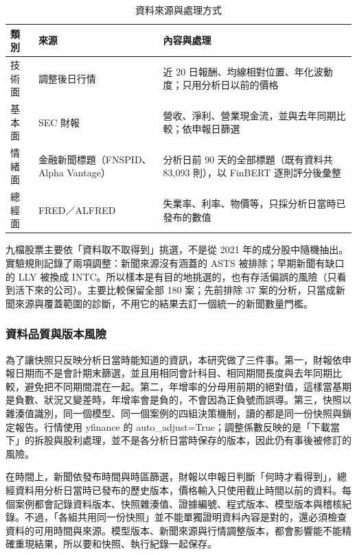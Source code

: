 \documentclass[12pt,a4paper]{article}
\numberwithin{table}{section}
\numberwithin{figure}{section}
\begin{document}
\begin{table}[H]
\centering\small
\caption{資料來源與處理方式}
\label{tab:data}
\begin{tabularx}{\textwidth}{@{}L{.10} L{.25} Y@{}}
\toprule
類別 & 來源 & 內容與處理 \\
\midrule
技術面 & 調整後日行情 & 近 20 日報酬、均線相對位置、年化波動度；只用分析日以前的價格 \\
基本面 & SEC 財報 & 營收、淨利、營業現金流，並與去年同期比較；依申報日篩選 \\
情緒面 & 金融新聞標題（FNSPID、Alpha Vantage） & 分析日前 90 天的全部標題（既有資料共 83,093 則），以 FinBERT 逐則評分後彙整 \\
總經面 & FRED／ALFRED & 失業率、利率、物價等，只採分析日當時已發布的數值 \\
\bottomrule
\end{tabularx}
\end{table}

九檔股票主要依「資料取不取得到」挑選，不是從 2021 年的成分股中隨機抽出。實驗規則記錄了兩項調整：新聞來源沒有涵蓋的 ASTS 被排除；早期新聞有缺口的 LLY 被換成 INTC。所以樣本是有目的地挑選的，也有存活偏誤的風險（只看到活下來的公司）。主要比較保留全部 180 案；先前排除 37 案的分析，只當成新聞來源與覆蓋範圍的診斷，不用它的結果去訂一個統一的新聞數量門檻。

\subsubsection{資料品質與版本風險}
為了讓快照只反映分析日當時能知道的資訊，本研究做了三件事。第一，財報依申報日期而不是會計期末篩選，並且用相同會計科目、相同期間長度與去年同期比較，避免把不同期間混在一起。第二，年增率的分母用前期的絕對值，這樣當基期是負數、狀況又變差時，年增率會是負的，不會因為正負號而誤導。第三，快照以雜湊值識別，同一個模型、同一個案例的四組決策機制，讀的都是同一份快照與鎖定報告。行情使用 yfinance 的 auto\_adjust=True；調整係數反映的是「下載當下」的拆股與股利處理，並不是各分析日當時保存的版本，因此仍有事後被修訂的風險。

在時間上，新聞依發布時間與時區篩選，財報以申報日判斷「何時才看得到」，總經資料用分析日當時已發布的歷史版本，價格輸入只使用截止時間以前的資料。每個案例都會記錄資料版本、快照雜湊值、證據編號、程式版本、模型版本與稽核紀錄。不過，「各組共用同一份快照」並不能單獨證明資料內容是對的，還必須檢查資料的可用時間與來源。模型版本、新聞來源與行情調整版本，都會影響能不能精確重現結果，所以要和快照、執行紀錄一起保存。
\end{document}
